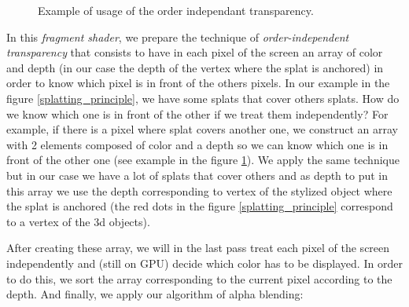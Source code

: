 \begin{figure}
    \begin{center}
    \end{center}
    \caption{Example of usage of the order independant transparency.}
    \label{order}
\end{figure}

In this \textit{fragment shader}, we prepare the technique of \textit{order-independent transparency} that consists to have in each pixel of the screen an array of color and depth (in our case the depth of the vertex where the splat is anchored) in order to know which pixel is in front of the others pixels. In our example in the figure \ref{splatting_principle}, we have some splats that cover others splats. How do we know which one is in front of the other if we treat them independently? For example, if there is a pixel where splat covers another one, we construct an array with 2 elements composed of color and a depth so we can know which one is in front of the other one (see example in the figure \ref{order}). We apply the same technique but in our case we have a lot of splats that cover others and as depth to put in this array we use the depth corresponding to vertex of the stylized object where the splat is anchored (the red dots in the figure \ref{splatting_principle} correspond to a vertex of the 3d objects). \newline

After creating these array, we will in the last pass treat each pixel of the screen independently and (still on GPU) decide which color has to be displayed. In order to do this, we sort the array corresponding to the current pixel according to the depth. And finally, we apply our algorithm of alpha blending:



